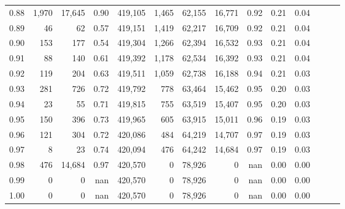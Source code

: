 \begin{tabular}{rrrrrrrrrrrrrr}
0.88 &   1,970 &  17,645 &  0.90 &  419,105 &    1,465 &  62,155 &  16,771 &  0.92 &  0.21 &      0.04 \\
0.89 &      46 &      62 &  0.57 &  419,151 &    1,419 &  62,217 &  16,709 &  0.92 &  0.21 &      0.04 \\
0.90 &     153 &     177 &  0.54 &  419,304 &    1,266 &  62,394 &  16,532 &  0.93 &  0.21 &      0.04 \\
0.91 &      88 &     140 &  0.61 &  419,392 &    1,178 &  62,534 &  16,392 &  0.93 &  0.21 &      0.04 \\
0.92 &     119 &     204 &  0.63 &  419,511 &    1,059 &  62,738 &  16,188 &  0.94 &  0.21 &      0.03 \\
0.93 &     281 &     726 &  0.72 &  419,792 &      778 &  63,464 &  15,462 &  0.95 &  0.20 &      0.03 \\
0.94 &      23 &      55 &  0.71 &  419,815 &      755 &  63,519 &  15,407 &  0.95 &  0.20 &      0.03 \\
0.95 &     150 &     396 &  0.73 &  419,965 &      605 &  63,915 &  15,011 &  0.96 &  0.19 &      0.03 \\
0.96 &     121 &     304 &  0.72 &  420,086 &      484 &  64,219 &  14,707 &  0.97 &  0.19 &      0.03 \\
0.97 &       8 &      23 &  0.74 &  420,094 &      476 &  64,242 &  14,684 &  0.97 &  0.19 &      0.03 \\
0.98 &     476 &  14,684 &  0.97 &  420,570 &        0 &  78,926 &       0 &   nan &  0.00 &      0.00 \\
0.99 &       0 &       0 &   nan &  420,570 &        0 &  78,926 &       0 &   nan &  0.00 &      0.00 \\
1.00 &       0 &       0 &   nan &  420,570 &        0 &  78,926 &       0 &   nan &  0.00 &      0.00 \\
\bottomrule
\end{tabular}
